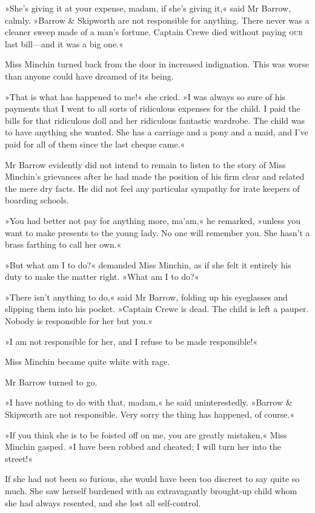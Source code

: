 »She's giving it at your expense, madam, if she's giving it,« said Mr Barrow, calmly. »Barrow \& Skipworth are not responsible for anything. There never was a cleaner sweep made of a man's fortune. Captain Crewe died without paying \textsc{our} last bill—and it was a big one.«

Miss Minchin turned back from the door in increased indignation. This was worse than anyone could have dreamed of its being.

»That is what has happened to me!« she cried. »I was always so sure of his payments that I went to all sorts of ridiculous expenses for the child. I paid the bills for that ridiculous doll and her ridiculous fantastic wardrobe. The child was to have anything she wanted. She has a carriage and a pony and a maid, and I've paid for all of them since the last cheque came.«

Mr Barrow evidently did not intend to remain to listen to the story of Miss Minchin's grievances after he had made the position of his firm clear and related the mere dry facts. He did not feel any particular sympathy for irate keepers of boarding schools.

»You had better not pay for anything more, ma'am,« he remarked, »unless you want to make presents to the young lady. No one will remember you. She hasn't a brass farthing to call her own.«

»But what am I to do?« demanded Miss Minchin, as if she felt it entirely his duty to make the matter right. »What am I to do?«

»There isn't anything to do,« said Mr Barrow, folding up his eyeglasses and slipping them into his pocket. »Captain Crewe is dead. The child is left a pauper. Nobody is responsible for her but you.«

»I am not responsible for her, and I refuse to be made responsible!«

Miss Minchin became quite white with rage.

Mr Barrow turned to go.

»I have nothing to do with that, madam,« he said uninterestedly. »Barrow \& Skipworth are not responsible. Very sorry the thing has happened, of course.«

»If you think she is to be foisted off on me, you are greatly mistaken,« Miss Minchin gasped. »I have been robbed and cheated; I will turn her into the street!«

If she had not been so furious, she would have been too discreet to say quite so much. She saw herself burdened with an extravagantly brought-up child whom she had always resented, and she lost all self-control.

